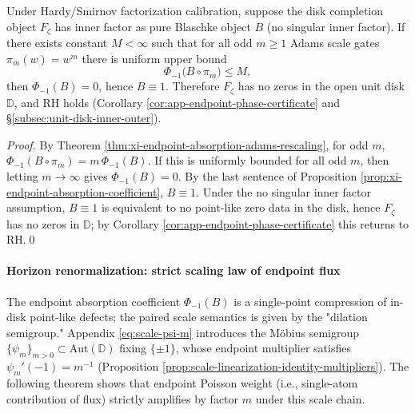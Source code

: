 \begin{theorem}[Multiscale consistency \texorpdfstring{$\Longrightarrow$}{=>} fixed slice support: sufficient condition for odd Adams gate endpoint budget uniform upper bound]\label{thm:xi-multiscale-consistency-implies-rh}
Under Hardy/Smirnov factorization calibration, suppose the disk completion object \(F_\zeta\) has inner factor as pure Blaschke object \(B\) (no singular inner factor).
If there exists constant \(M<\infty\) such that for all odd \(m\ge 1\) Adams scale gates \(\pi_m(w)=w^m\) there is uniform upper bound
\[
\Phi_{-1}\bigl(B\circ \pi_m\bigr)\le M,
\]
then \(\Phi_{-1}(B)=0\), hence \(B\equiv 1\).
Therefore \(F_\zeta\) has no zeros in the open unit disk \(\mathbb{D}\), and RH holds (Corollary \ref{cor:app-endpoint-phase-certificate} and \S\ref{subsec:unit-disk-inner-outer}).
\end{theorem}

\begin{proof}
By Theorem \ref{thm:xi-endpoint-absorption-adams-rescaling}, for odd \(m\),
\(
\Phi_{-1}(B\circ\pi_m)=m\,\Phi_{-1}(B)
\).
If this is uniformly bounded for all odd \(m\), then letting \(m\to\infty\) gives \(\Phi_{-1}(B)=0\).
By the last sentence of Proposition \ref{prop:xi-endpoint-absorption-coefficient}, \(B\equiv 1\).
Under the no singular inner factor assumption, \(B\equiv 1\) is equivalent to no point-like zero data in the disk, hence \(F_\zeta\) has no zeros in \(\mathbb{D}\); by Corollary \ref{cor:app-endpoint-phase-certificate} this returns to RH.\qed
\end{proof}

\paragraph{Horizon renormalization: strict scaling law of endpoint flux}
The endpoint absorption coefficient \(\Phi_{-1}(B)\) is a single-point compression of in-disk point-like defects; the paired scale semantics is given by the "dilation semigroup."
Appendix \eqref{eq:scale-psi-m} introduces the Möbius semigroup \(\{\psi_m\}_{m>0}\subset\mathrm{Aut}(\mathbb{D})\) fixing \(\{\pm 1\}\), whose endpoint multiplier satisfies \(\psi_m'(-1)=m^{-1}\) (Proposition \ref{prop:scale-linearization-identity-multipliers}).
The following theorem shows that endpoint Poisson weight (i.e., single-atom contribution of flux) strictly amplifies by factor \(m\) under this scale chain.

